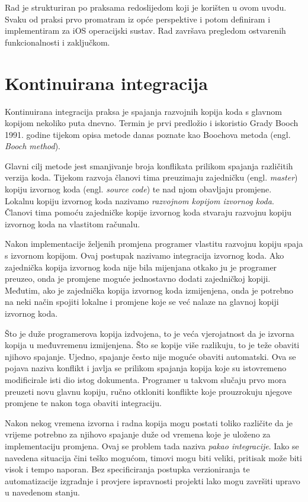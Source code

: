 \documentclass[times, utf8, diplomski, numeric]{fer}
\newcommand{\eng}[1]{(engl. \textit{#1})}
\begin{document}
Rad je strukturiran po praksama redoslijedom koji je korišten u ovom uvodu. Svaku od praksi prvo promatram iz opće perspektive i potom definiram i implementiram za iOS operacijski sustav. Rad završava pregledom ostvarenih funkcionalnosti i zaključkom.


\chapter{Kontinuirana integracija} \label{header:Kontinuirana_Integracija}

Kontinuirana integracija praksa je spajanja razvojnih kopija koda s glavnom kopijom nekoliko puta dnevno. Termin je prvi predložio i iskoristio Grady Booch 1991. godine tijekom opisa metode danas poznate kao Boochova metoda \eng{Booch method}\citep{wiki:BoochMethod}.

Glavni cilj metode jest smanjivanje broja konflikata prilikom spajanja različitih verzija koda. Tijekom razvoja članovi tima preuzimaju zajedničku \eng{master} kopiju izvornog koda \eng{source code} te nad njom obavljaju promjene. Lokalnu kopiju izvornog koda nazivamo \textit{razvojnom kopijom izvornog koda}. Članovi tima pomoću zajedničke kopije izvornog koda stvaraju razvojnu kopiju izvornog koda na vlastitom računalu.

Nakon implementacije željenih promjena programer vlastitu razvojnu kopiju spaja s izvornom kopijom. Ovaj postupak nazivamo integracija izvornog koda. Ako zajednička kopija izvornog koda nije bila mijenjana otkako ju je programer preuzeo, onda je promjene moguće jednostavno dodati zajedničkoj kopiji. Međutim, ako je zajednička kopija izvornog koda izmijenjena, onda je potrebno na neki način spojiti lokalne i promjene koje se već nalaze na glavnoj kopiji izvornog koda.

Što je duže programerova kopija izdvojena, to je veća vjerojatnost da je izvorna kopija u međuvremenu izmijenjena. Što se kopije više razlikuju, to je teže obaviti njihovo spajanje. Ujedno, spajanje često nije moguće obaviti automatski. Ova se pojava naziva konflikt i javlja se prilikom spajanja kopija koje su istovremeno modificirale isti dio istog dokumenta. Programer u takvom slučaju prvo mora preuzeti novu glavnu kopiju, ručno otkloniti konflikte koje prouzrokuju njegove promjene te nakon toga obaviti integraciju.

Nakon nekog vremena izvorna i radna kopija mogu postati toliko različite da je vrijeme potrebno za njihovo spajanje duže od vremena koje je uloženo za implementaciju promjena. Ovaj se problem tada naziva \textit{pakao integracije}. Iako se navedena situacija čini teško mogućom, timovi mogu biti veliki, pritisak može biti visok i tempo naporan. Bez specificiranja postupka verzioniranja te automatizacije izgradnje i provjere ispravnosti projekti lako mogu završiti upravo u navedenom stanju.
\end{document}
